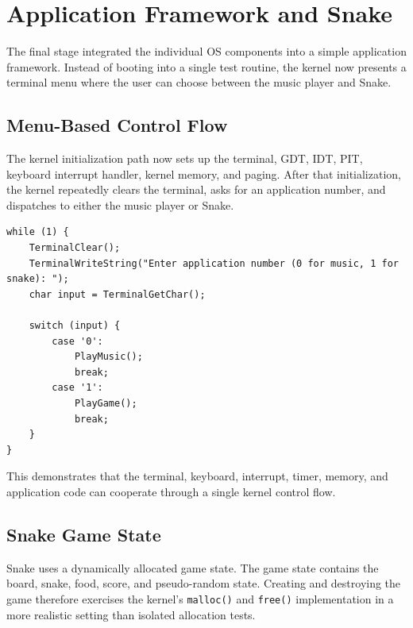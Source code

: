 \section{Application Framework and Snake}

The final stage integrated the individual OS components into a simple application framework. Instead of booting into a single test routine, the kernel now presents a terminal menu where the user can choose between the music player and Snake.

\subsection{Menu-Based Control Flow}
The kernel initialization path now sets up the terminal, GDT, IDT, PIT, keyboard interrupt handler, kernel memory, and paging. After that initialization, the kernel repeatedly clears the terminal, asks for an application number, and dispatches to either the music player or Snake.

\begin{listing}[H]
\begin{verbatim}
while (1) {
    TerminalClear();
    TerminalWriteString("Enter application number (0 for music, 1 for snake): ");
    char input = TerminalGetChar();

    switch (input) {
        case '0':
            PlayMusic();
            break;
        case '1':
            PlayGame();
            break;
    }
}
\end{verbatim}
\caption{Application menu dispatch in the kernel main loop.}
\end{listing}

This demonstrates that the terminal, keyboard, interrupt, timer, memory, and application code can cooperate through a single kernel control flow.
\clearpage

\subsection{Snake Game State}
Snake uses a dynamically allocated game state. The game state contains the board, snake, food, score, and pseudo-random state. Creating and destroying the game therefore exercises the kernel's \texttt{malloc()} and \texttt{free()} implementation in a more realistic setting than isolated allocation tests.

